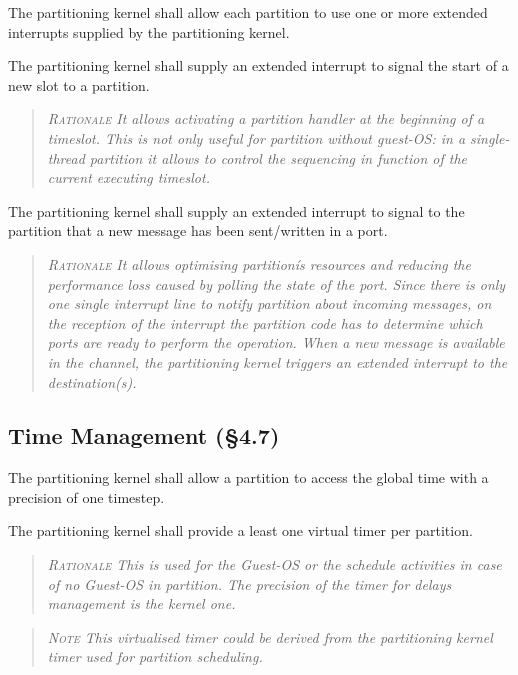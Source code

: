 The partitioning kernel shall allow each partition to use one or more extended interrupts supplied by the partitioning kernel.

The partitioning kernel shall supply an extended interrupt to signal the start of a new slot to a partition.
\begin{quote}\it
\textsc{Rationale}
It allows activating a partition handler at the beginning of a timeslot. This is not only useful for partition without guest-OS: in a single-thread partition it allows to control the sequencing in function of the current executing timeslot.
\end{quote}

The partitioning kernel shall supply an extended interrupt to signal to the partition that a new message has been sent/written in a port.
\begin{quote}\it
\textsc{Rationale}
It allows optimising partitionís resources and reducing the performance loss caused by polling the state of the port. Since there is only one single interrupt line to notify partition about incoming messages, on the reception of
the interrupt the partition code has to determine which ports are ready to perform the operation.
When a new message is available in the channel, the partitioning kernel triggers an extended interrupt to the destination(s).
\end{quote}

\subsection{Time Management (\S4.7)}

The partitioning kernel shall allow a partition to access the global time with a precision of one timestep.

The partitioning kernel shall provide a least one virtual timer per partition.
\begin{quote}\it
\textsc{Rationale}
This is used for the Guest-OS or the schedule activities in case of no Guest-OS in partition. The precision of the timer for delays management is the kernel one.
\end{quote}
\begin{quote}\it
\textsc{Note}
This virtualised timer could be derived from the partitioning kernel timer used for partition scheduling.
\end{quote}

